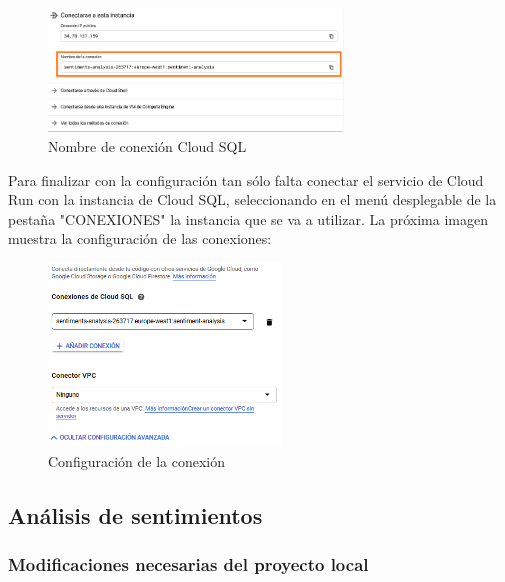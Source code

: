 \begin{figure}[ht]
    	\begin{center}
    		\includegraphics[width = 0.70\textwidth]{Figuras/NombreCloudSQL.PNG}
    	\end{center}
    	\caption{\label{fig:NombreCloudSQL} Nombre de conexión Cloud SQL}
\end{figure}

\newpage

Para finalizar con la configuración tan sólo falta conectar el servicio de Cloud Run con la instancia de Cloud SQL, seleccionando en el menú desplegable de la pestaña "CONEXIONES" la instancia que se va a utilizar. La próxima imagen muestra la configuración de las conexiones:

\begin{figure}[ht]
    	\begin{center}
    		\includegraphics[width = 0.55\textwidth]{Figuras/ConexionCloudSQL.PNG}
    	\end{center}
    	\caption{\label{fig:ConexionCloudSQL} Configuración de la conexión}
\end{figure}

\newpage

\subsection{Análisis de sentimientos}

\subsubsection{Modificaciones necesarias del proyecto local}

